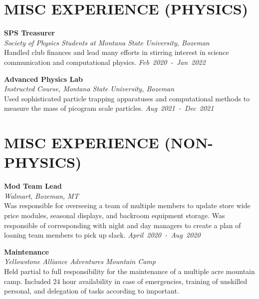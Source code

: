 \documentclass[margin]{res}
\begin{document}
\begin{resume}
\section{MISC EXPERIENCE (PHYSICS)}

\noindent
\raggedright
\textbf{\textbf{SPS Treasurer}}\\
{\sl Society of Physics Students at Montana State University, Bozeman}\\\vspace{0.5ex}
Handled club finances and lead many efforts in stirring interest in science communication and computational physics.   \hfill
{\sl Feb~2020~-~Jan~2022}

\noindent
\raggedright
\textbf{Advanced Physics Lab}\\
{\sl Instructed Course, Montana State University, Bozeman}\\\vspace{0.5ex}
Used sophisticated particle trapping apparatuses and computational methods to measure the mass of picogram scale particles.  \hfill
{\sl Aug~2021~-~Dec~2021}


\section{MISC EXPERIENCE (NON-PHYSICS)}
\noindent
\raggedright
\textbf{Mod Team Lead}\\
{\sl Walmart, Bozeman, MT}\\\vspace{0.5ex}
Was responsible for overseeing a team of multiple members to update store wide price modules, seasonal displays, and backroom equipment storage. Was responsible of corresponding with night and day managers to create a plan of loaning team members to pick up slack.\hfill
{\sl April~2020~-~Aug~2020}

\noindent
\raggedright
\textbf{Maintenance}\\
{\sl Yellowstone Alliance Adventures Mountain Camp}\\\vspace{0.5ex}
Held partial to full responsibility for the maintenance of a multiple acre mountain camp. Included 24 hour availability in case of emergencies, training of unskilled personal, and delegation of tasks according to important. \\


\end{resume}
\end{document}
